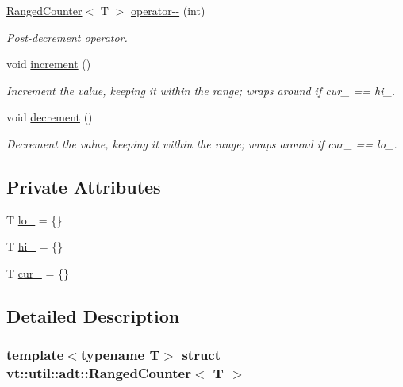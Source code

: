 \begin{DoxyCompactItemize}
\hyperlink{structvt_1_1util_1_1adt_1_1_ranged_counter}{Ranged\+Counter}$<$ T $>$ \hyperlink{structvt_1_1util_1_1adt_1_1_ranged_counter_a0e52a234fa27ae0d6a213cdf3a4dbb4d}{operator-\/-\/} (int)
\begin{DoxyCompactList}\small\item\em Post-\/decrement operator. \end{DoxyCompactList}\item 
void \hyperlink{structvt_1_1util_1_1adt_1_1_ranged_counter_aa210bb5eb729be245581c3219e179584}{increment} ()
\begin{DoxyCompactList}\small\item\em Increment the value, keeping it within the range; wraps around if {\ttfamily cur\+\_\+} == hi\+\_\+. \end{DoxyCompactList}\item 
void \hyperlink{structvt_1_1util_1_1adt_1_1_ranged_counter_ab2ccaa051d8ecbd2e2b0687ee3cb722a}{decrement} ()
\begin{DoxyCompactList}\small\item\em Decrement the value, keeping it within the range; wraps around if {\ttfamily cur\+\_\+} == lo\+\_\+. \end{DoxyCompactList}\end{DoxyCompactItemize}
\subsection*{Private Attributes}
\begin{DoxyCompactItemize}
\item 
T \hyperlink{structvt_1_1util_1_1adt_1_1_ranged_counter_a1463f2ae55747e5b1fae2ee1da281937}{lo\+\_\+} = \{\}
\item 
T \hyperlink{structvt_1_1util_1_1adt_1_1_ranged_counter_a453f72e1b6d6bf2bf380bff7fe477c34}{hi\+\_\+} = \{\}
\item 
T \hyperlink{structvt_1_1util_1_1adt_1_1_ranged_counter_a939039fc75a2c589ab72733efe72df84}{cur\+\_\+} = \{\}
\end{DoxyCompactItemize}


\subsection{Detailed Description}
\subsubsection*{template$<$typename T$>$\newline
struct vt\+::util\+::adt\+::\+Ranged\+Counter$<$ T $>$}

